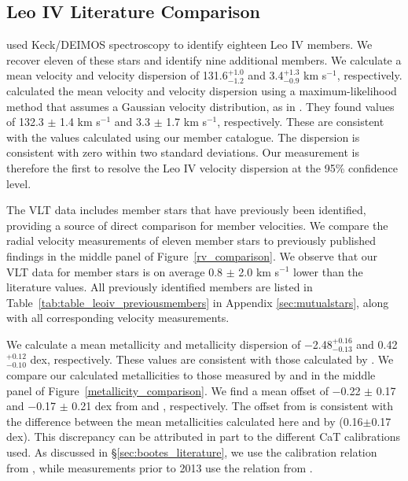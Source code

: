\documentclass[twocolumn]{aastex63}
\newcommand{\revise}[1]{#1}
\begin{document}
\subsection{Leo IV Literature Comparison}
\label{sec:leoiv_literature}
\citet{sim2007} used Keck/DEIMOS spectroscopy to identify eighteen Leo IV members. We recover eleven of these stars and identify nine additional members. We calculate a mean velocity and velocity dispersion of \revise{131.6$^{+1.0}_{-1.2}$ and 3.4$^{+1.3}_{-0.9}$} km s$^{-1}$, respectively. \citet{sim2007} calculated the mean velocity and velocity dispersion using a maximum-likelihood method that assumes a Gaussian velocity distribution, as in \citet{wal2006}. They found values of 132.3 $\pm$ 1.4 km s$^{-1}$ and 3.3 $\pm$ 1.7 km s$^{-1}$, respectively. These are consistent with the values calculated using our member catalogue. The \citet{sim2007} dispersion is consistent with zero within two standard deviations. Our measurement is therefore the first to resolve the Leo IV velocity dispersion at the 95\% confidence level.

The VLT data includes member stars that have previously been identified, providing a source of direct comparison for member velocities. We compare the radial velocity measurements of eleven member stars to previously published findings in the middle panel of Figure~\ref{rv_comparison}. We observe that our VLT data for member stars is on average 0.8 $\pm$ 2.0 km s$^{-1}$ lower than the literature values. All previously identified members are listed in Table~\ref{tab:table_leoiv_previousmembers} in Appendix \ref{sec:mutualstars}, along with all corresponding velocity measurements.

We calculate a mean metallicity and metallicity dispersion of \revise{$-$2.48$^{+0.16}_{-0.13}$ and 0.42$^{+0.12}_{-0.10}$ dex}, respectively. These values are consistent with those calculated by \citet{kir2013}. We compare our calculated metallicities to those measured by \citet{sim2007} and \citet{kir2013} in the middle panel of Figure~\ref{metallicity_comparison}. We find a mean offset of $-$0.22 $\pm$ 0.17 and $-$0.17 $\pm$ 0.21 dex from \citet{sim2007} and \citet{kir2013}, respectively. The offset from \citet{sim2007} is consistent with the difference between the mean metallicities calculated here and by \citet{sim2007} (0.16$\pm$0.17 dex). \revise{This discrepancy can be attributed in part to the different CaT calibrations used. As discussed in \S\ref{sec:bootes_literature}, we use the calibration relation from \citet{car2013}, while measurements prior to 2013 use the relation from \citet{rut1997}.}
\end{document}

